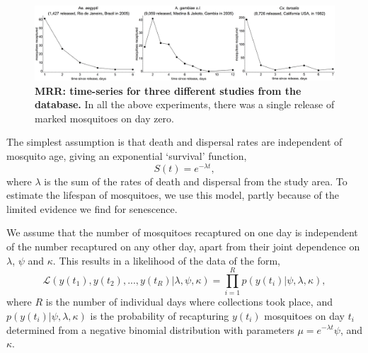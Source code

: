 \documentclass[12pt]{article}
\begin{document}
\begin{figure}[h]
	\centerline{\includegraphics[width=1.25\textwidth]{./Figure_files/mrr_exampleMRRSeries.pdf}}
	\caption{\textbf{MRR: time-series for three different studies from the \cite{guerra2014global} database.} In all the above experiments, there was a single release of marked mosquitoes on day zero.}
	\label{fig:mrr_exampleMRRSeries}
\end{figure}

The simplest assumption is that death and dispersal rates are independent of mosquito age, giving an exponential `survival' function,
%
\begin{equation}
S(t) = e^{-\lambda t},
\end{equation}
%
where $\lambda$ is the sum of the rates of death and dispersal from the study area. To estimate the lifespan of mosquitoes, we use this model, partly because of the limited evidence we find for senescence.

We assume that the number of mosquitoes recaptured on one day is independent of the number recaptured on any other day, apart from their joint dependence on $\lambda$, $\psi$ and $\kappa$. This results in a likelihood of the data of the form,
%
\begin{equation}
\mathcal{L}(y(t_1),y(t_2),...,y(t_R)|\lambda,\psi,\kappa) = \prod\limits_{i=1}^{R} p(y(t_i)|\psi,\lambda,\kappa),
\end{equation}
%
where $R$ is the number of individual days where collections took place, and $p(y(t_i)|\psi,\lambda,\kappa)$ is the probability of recapturing $y(t_i)$ mosquitoes on day $t_i$ determined from a negative binomial distribution with parameters $\mu = e^{-\lambda t} \psi$, and $\kappa$.
\end{document}
